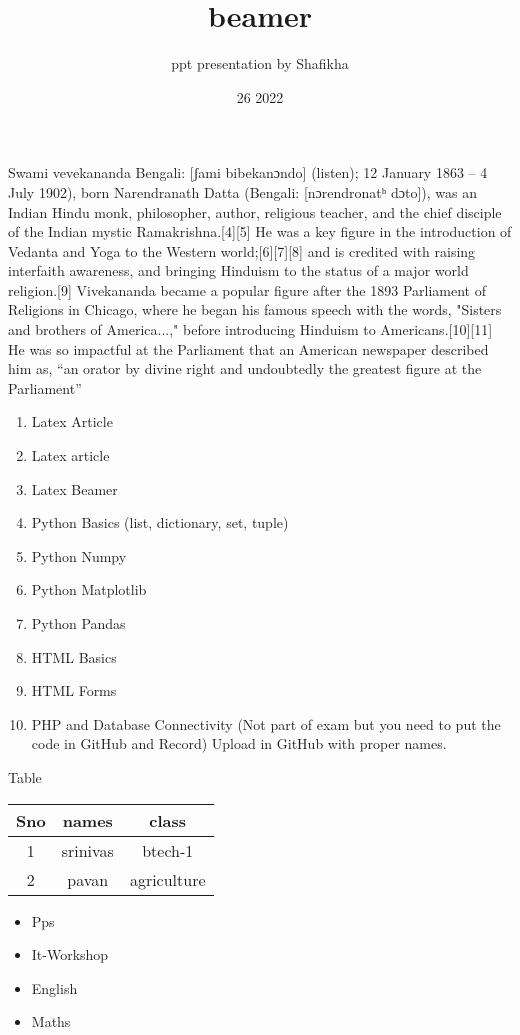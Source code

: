 \documentclass{beamer}
\title{beamer}
\author{ ppt presentation by Shafikha}
\date{26 2022}
\begin{document}
\maketitle
\begin{frame}Swami vevekananda Bengali: [ʃami bibekanɔndo] (listen); 12 January 1863 – 4 July 1902), born Narendranath Datta (Bengali: [nɔrendronatʰ dɔto]), was an Indian Hindu monk, philosopher, author, religious teacher, and the chief disciple of the Indian mystic Ramakrishna.[4][5] He was a key figure in the introduction of Vedanta and Yoga to the Western world;[6][7][8] and is credited with raising interfaith awareness, and bringing Hinduism to the status of a major world religion.[9] Vivekananda became a popular figure after the 1893 Parliament of Religions in Chicago, where he began his famous speech with the words, "Sisters and brothers of America...," before introducing Hinduism to Americans.[10][11] He was so impactful at the Parliament that an American newspaper described him as, “an orator by divine right and undoubtedly the greatest figure at the Parliament”     
\end{frame}
\begin{frame}
\begin{enumerate}
\item Latex Article
\item Latex article
\item Latex Beamer 
\item Python Basics (list, dictionary, set, tuple)
\item Python Numpy
\item Python Matplotlib
\item Python Pandas
\item HTML Basics
\item HTML Forms
\item PHP and Database Connectivity (Not part of exam but you need to put the code in GitHub and Record)
Upload in GitHub with proper names.
\end{enumerate}
\end{frame}
\begin{frame}{Table}
   \begin{tabular}{|c|c|c|}
 \hline
Sno & names & class\\
\hline
1 & srinivas & btech-1 \\
\hline
2 & pavan & agriculture\\
\hline
   \end{tabular} 
\end{frame}
\begin{itemize}
    \item Pps
    \item It-Workshop
    \item English
    \item Maths
\end{itemize}
\end{document}
